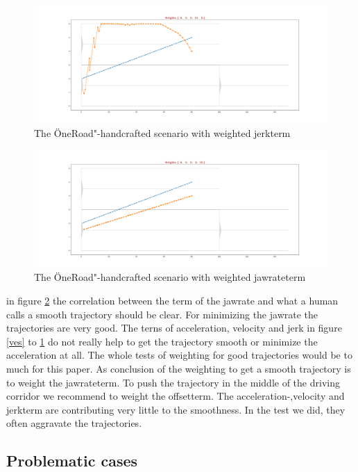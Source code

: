 \documentclass[conference]{IEEEtran}
\begin{document}
\begin{figure}[h]
\begin{center}
\includegraphics[scale = 0.6]{w00010.png}
\end{center}
\caption{The \"OneRoad"-handcrafted scenario with weighted jerkterm}
\label{jerk}
\end{figure}
\begin{figure}[h]
\begin{center}
\includegraphics[scale = 0.6]{w00001.png}
\end{center}
\caption{The \"OneRoad"-handcrafted scenario with weighted jawrateterm}
\label{jaw}
\end{figure}
in figure \ref{jaw} the correlation between the term of the jawrate and what a human calls a smooth trajectory should be clear. For minimizing the jawrate the trajectories are very good. The terns of acceleration, velocity and jerk in figure \ref{ves} to \ref{jerk} do not really help to get the trajectory smooth or minimize the acceleration at all. The whole tests of weighting for good trajectories would be to much for this paper.
As conclusion of the weighting to get a smooth trajectory is to weight the jawrateterm. To push the trajectory in the middle of the driving corridor we recommend to weight the offsetterm. The acceleration-,velocity and jerkterm are contributing very little to the smoothness. In the test we did, they often aggravate the trajectories.
\subsection{Problematic cases}
\end{document}
